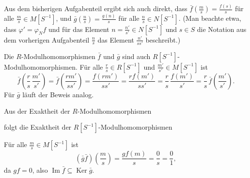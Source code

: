 \documentclass[a4paper,10pt]{article}
\theoremstyle{definition}
\newcommand{\Img}{\operatorname{Im}}
\newcommand{\Ker}{\operatorname{Ker}}
\begin{document}
Aus dem bisherigen Aufgabenteil ergibt sich auch direkt, dass $\bar{f}\left(\frac{m}{s}\right) = \frac{f(s)}{s}$ für alle $\frac{m}{s} \in M[S^{-1}]$, und $\bar{g}\left(\frac{n}{s}\right) = \frac{g(n)}{s}$ für alle $\frac{n}{s} \in N[S^{-1}]$. (Man beachte etwa, dass $\varphi' = \varphi_N f$ und für das Element $n = \frac{n'}{s'} \in N[S^{-1}]$ und $s \in S$ die Notation aus dem vorherigen Aufgabenteil $\frac{n}{s}$ das Element $\frac{n'}{ss'}$ beschreibt.)

Die $R$-Modulhomomorphismen $\bar{f}$ und $\bar{g}$ sind auch $R[S^{-1}]$-Modulhomomorphismen. Für alle $\frac{r}{s} \in R[S^{-1}]$ und $\frac{m'}{s'} \in M[S^{-1}]$ ist
\[
 \bar{f}\left( \frac{r}{s} \, \frac{m'}{s'} \right)
 = \bar{f}\left( \frac{rm'}{ss'} \right)
 = \frac{f(rm')}{ss'}
 = \frac{r f(m')}{ss'}
 = \frac{r}{s} \, \frac{f(m')}{s'}
 = \frac{r}{s} \, \bar{f}\left( \frac{m'}{s'} \right).
\]
Für $\bar{g}$ läuft der Beweis analog.

Aus der Exaktheit der $R$-Modulhomomorphismen
\begin{center}
\end{center}
folgt die Exaktheit der $R[S^{-1}]$-Modulhomomorphismen
\begin{center}
\end{center}

Für alle $\frac{m}{s} \in M[S^{-1}]$ ist
\[
 (\bar{g} \bar{f})\left( \frac{m}{s} \right)
 = \frac{gf(m)}{s}
 = \frac{0}{s}
 = \frac{0}{1},
\]
da $gf = 0$, also $\Img \bar{f} \subseteq \Ker \bar{g}$.
\end{document}
